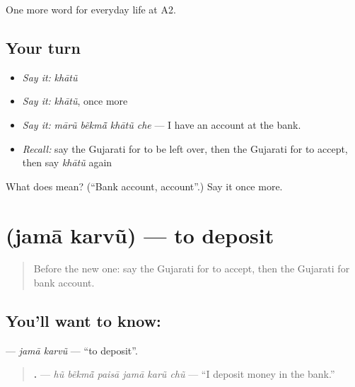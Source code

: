 \begin{grammarlens}[title={What you've built}]
One more word for everyday life at A2.
\end{grammarlens}

\subsection*{Your turn}
\begin{itemize}
\raggedright
  \item \emph{Say it:} \emph{khātũ}
  \item \emph{Say it:} \emph{khātũ}, once more
  \item \emph{Say it:} \emph{mārũ bẽkmā̃ khātũ che} — I have an account at the bank.
  \item \emph{Recall:} say the Gujarati for to be left over, then the Gujarati for to accept, then say \emph{khātũ} again
\end{itemize}

\begin{tcolorbox}[breakable,colback=teal!4,colframe=teal!35!black,title={Before you move on}]
What does  mean? (\textquotedblleft{}Bank account, account\textquotedblright{}.) Say it once more.
\end{tcolorbox}
\section[\texorpdfstring{\gu{જમા} \gu{કરવું} (jamā karvũ)}{જમા કરવું (jamā karvũ)}]{  (jamā karvũ) — to deposit}

\label{lesson:GU-C190-jama-karvu}



\begin{quote}
Before the new one: say the Gujarati for to accept, then the Gujarati for bank account.
\end{quote}

\subsection*{You'll want to know:  }
\textbf{ } — \emph{jamā karvũ} — \textquotedblleft{}to deposit\textquotedblright{}.

\begin{quote}
\textbf{     .} — \emph{hũ bẽkmā̃ paisā jamā karũ chũ} — \textquotedblleft{}I deposit money in the bank.\textquotedblright{}
\end{quote}

